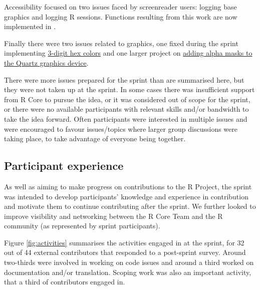 Accessibility focused on two issues faced by screenreader users: logging base
graphics and logging R sessions. Functions resulting from this work are now
implemented in .

Finally there were two issues related to graphics, one fixed during the sprint
implementing \href{https://github.com/r-devel/r-project-sprint-2023/issues/74}{3-digit hex colors} and one
larger project on \href{https://github.com/r-devel/r-project-sprint-2023/issues/43}{adding alpha masks to the Quartz graphics device}.

There were more issues prepared for the sprint than are summarised here, but
they were not taken up at the sprint. In some cases there was insufficient support from R Core to pursue the idea, or it was considered out of scope for the sprint, or there were no available participants with relevant skills and/or bandwidth to take the idea forward. Often participants were interested in multiple issues and were encouraged to favour issues/topics where larger group discussions were taking
place, to take advantage of everyone being together.

\hypertarget{participant-experience}{%
\subsection{Participant experience}\label{participant-experience}}

As well as aiming to make progress on contributions to the R Project, the
sprint was intended to develop participants' knowledge and experience in
contribution and motivate them to continue contributing after the sprint.
We further looked to improve visibility and networking between
the R Core Team and the R community (as represented by sprint
participants).

Figure \ref{fig:activities} summarises the activities engaged in at the sprint, for 32 out of 44 external contributors that responded to a post-sprint survey.
Around two-thirds were involved in working on code issues and around a third worked on documentation and/or translation. Scoping work was also an important activity, that a third of contributors engaged in.

